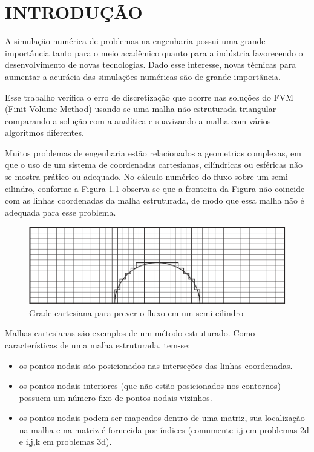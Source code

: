 \chapter[INTRODUÇÃO]{INTRODUÇÃO}

A simulação  numérica de problemas na engenharia possui uma grande importância tanto para o meio acadêmico quanto para a indústria favorecendo o desenvolvimento de novas tecnologias. Dado esse interesse, novas técnicas para aumentar a acurácia das simulações numéricas são de grande importância. \cite{Du1999}

Esse trabalho verifica o erro de discretização que ocorre nas soluções do FVM (Finit Volume Method) usando-se uma malha não estruturada triangular comparando a solução com a analítica e suavizando a malha com vários algoritmos diferentes.

Muitos problemas de engenharia estão relacionados a geometrias complexas, em que o uso de um sistema de coordenadas cartesianas, cilíndricas ou esféricas não se mostra prático ou adequado. No cálculo numérico do fluxo sobre um semi cilindro, conforme a Figura \ref{fig:semicilindro} observa-se que a fronteira da Figura não coincide com as linhas coordenadas da malha estruturada, de modo que essa malha não é adequada para esse problema. \cite{Versteeg2007}

\begin{figure}[]
\centering
\includegraphics[width=.6\linewidth]{fig/semicilindro.png}
 \caption{Grade cartesiana para prever o fluxo em um semi cilindro}
   \label{fig:semicilindro}
\end{figure}

Malhas cartesianas são exemplos de um método estruturado. Como características de uma malha estruturada, tem-se:

\begin{itemize}
    \item os pontos nodais são posicionados nas interseções das linhas coordenadas.
    \item os pontos nodais interiores (que não estão posicionados nos contornos) possuem um número fixo de pontos nodais vizinhos.
    \item os pontos nodais podem ser mapeados dentro de uma matriz, sua localização na malha e na matriz é fornecida por índices (comumente i,j em problemas 2d e i,j,k em problemas 3d).
\end{itemize}

